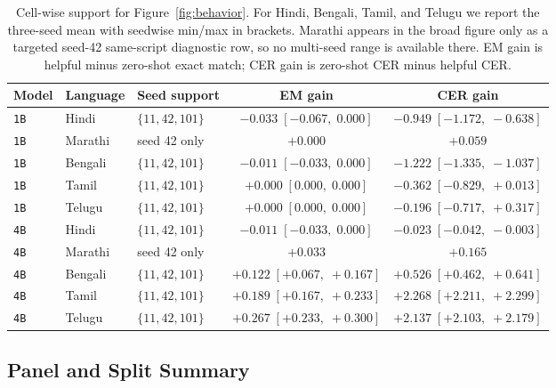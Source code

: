 \documentclass{article}
\begin{document}
\begin{table}[t]
\centering
\small
\setlength{\tabcolsep}{7pt}
\begin{tabular}{lllcc}
\toprule
\textbf{Model} & \textbf{Language} & \textbf{Seed support} & \textbf{EM gain} & \textbf{CER gain} \\
\midrule
\texttt{1B} & Hindi   & $\{11, 42, 101\}$ & $-0.033\;[-0.067,\;0.000]$ & $-0.949\;[-1.172,\;-0.638]$ \\
\texttt{1B} & Marathi & seed 42 only      & $+0.000$                     & $+0.059$                      \\
\texttt{1B} & Bengali & $\{11, 42, 101\}$ & $-0.011\;[-0.033,\;0.000]$ & $-1.222\;[-1.335,\;-1.037]$ \\
\texttt{1B} & Tamil   & $\{11, 42, 101\}$ & $+0.000\;[0.000,\;0.000]$  & $-0.362\;[-0.829,\;+0.013]$ \\
\texttt{1B} & Telugu  & $\{11, 42, 101\}$ & $+0.000\;[0.000,\;0.000]$  & $-0.196\;[-0.717,\;+0.317]$ \\
\midrule
\texttt{4B} & Hindi   & $\{11, 42, 101\}$ & $-0.011\;[-0.033,\;0.000]$ & $-0.023\;[-0.042,\;-0.003]$ \\
\texttt{4B} & Marathi & seed 42 only      & $+0.033$                     & $+0.165$                      \\
\texttt{4B} & Bengali & $\{11, 42, 101\}$ & $+0.122\;[+0.067,\;+0.167]$ & $+0.526\;[+0.462,\;+0.641]$ \\
\texttt{4B} & Tamil   & $\{11, 42, 101\}$ & $+0.189\;[+0.167,\;+0.233]$ & $+2.268\;[+2.211,\;+2.299]$ \\
\texttt{4B} & Telugu  & $\{11, 42, 101\}$ & $+0.267\;[+0.233,\;+0.300]$ & $+2.137\;[+2.103,\;+2.179]$ \\
\bottomrule
\end{tabular}
\caption{Cell-wise support for Figure~\ref{fig:behavior}. For Hindi, Bengali, Tamil, and Telugu we report the three-seed mean with seedwise min/max in brackets. Marathi appears in the broad figure only as a targeted seed-42 same-script diagnostic row, so no multi-seed range is available there. EM gain is helpful minus zero-shot exact match; CER gain is zero-shot CER minus helpful CER.}
\label{tab:behavior_seed_ranges}
\end{table}

\subsection{Panel and Split Summary}\label{app:panelsummary}
\end{document}
